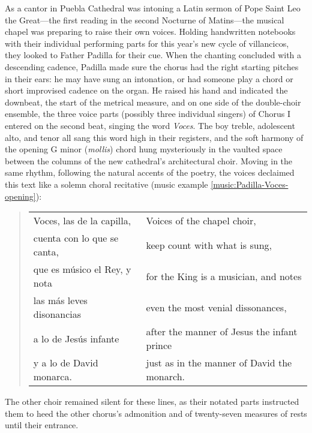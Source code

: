 As a cantor in Puebla Cathedral was intoning a Latin sermon of Pope Saint Leo the
Great---the first reading in the second Nocturne of Matins---the musical chapel
was preparing to raise their own voices.
Holding handwritten notebooks with their individual performing parts for this
year's new cycle of villancicos, they looked to Father Padilla for their cue.
When the chanting concluded with a descending cadence, Padilla made sure the
chorus had the right starting pitches in their ears: he may have sung an
intonation, or had someone play a chord or short improvised cadence on the
organ.
He raised his hand and indicated the downbeat, the start of the metrical
measure, and on one side of the double-choir ensemble, the three
voice parts (possibly three individual singers) of Chorus I entered on the
second beat, singing the word \emph{Voces}.
The boy treble, adolescent alto, and tenor all sang this word high in their
registers, and the soft harmony of the opening G minor (\emph{mollis}) chord hung
mysteriously in the vaulted space between the columns of the new cathedral's
architectural choir.
Moving in the same rhythm, following the natural accents of the poetry, the
voices declaimed this text like a solemn choral recitative (music example
\ref{music:Padilla-Voces-opening}):
\begin{quote}
    \begin{tabular}{ll}
        Voces, las de la capilla,       
        & Voices of the chapel choir, \\
       
        cuenta con lo que se canta,     
        & keep count with what is sung,  \\
       
        que es músico el Rey, y nota    
        & for the King is a musician, and notes \\
        las más leves disonancias       
        & even the most venial dissonances, \\
       
        a lo de Jesús infante           
        & after the manner of Jesus the infant prince \\
       
        y a lo de David monarca.        
        & just as in the manner of David the monarch.
    \end{tabular}
\end{quote}
The other choir remained silent for these lines, as their notated parts
instructed them to heed the other chorus's admonition and  of
twenty-seven measures of rests until their entrance.

